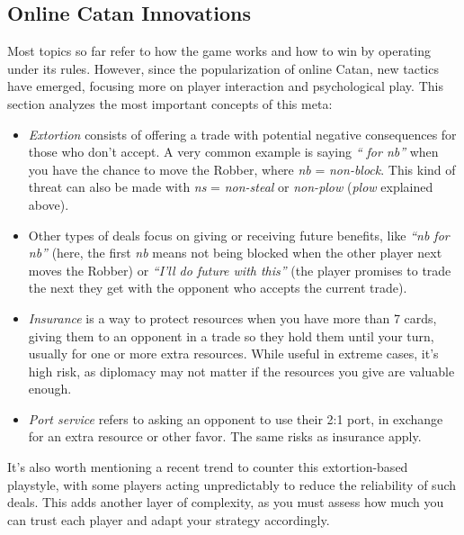 \documentclass[12pt]{article}
\begin{document}
\subsection{Online Catan Innovations}
Most topics so far refer to how the game works and how to win by operating under its rules.
However, since the popularization of online Catan, new tactics have emerged, focusing more on player interaction and psychological play.
This section analyzes the most important concepts of this meta:
\vspace{-0.2cm}
\begin{itemize}
    \item \textit{Extortion} consists of offering a trade with potential negative consequences for those who don't accept. 
    A very common example is saying \textit{`` for nb''} when you have the chance to move the Robber, where \textit{nb} = \textit{non-block}.
    This kind of threat can also be made with \textit{ns} = \textit{non-steal} or \textit{non-plow} (\textit{plow} explained above).
    \vspace{-0.2cm}
    \item Other types of deals focus on giving or receiving future benefits, like
    \textit{``nb for nb''} (here, the first \textit{nb} means not being blocked when the other player next moves the Robber) or
    \textit{``I'll do future  with this''} (the player promises to trade the next  they get with the opponent who accepts the current trade).
    \vspace{-0.2cm}
    \item \textit{Insurance} is a way to protect resources when you have more than 7 cards, giving them to an opponent in a trade so they hold them until your turn, usually for one or more extra resources.
    While useful in extreme cases, it's high risk, as diplomacy may not matter if the resources you give are valuable enough.
    \vspace{-0.2cm}
    \item \textit{Port service} refers to asking an opponent to use their 2:1 port, in exchange for an extra resource or other favor.
    The same risks as insurance apply.
\end{itemize}
\vspace{-0.2cm}
It's also worth mentioning a recent trend to counter this extortion-based playstyle, with some players acting unpredictably to reduce the reliability of such deals.
This adds another layer of complexity, as you must assess how much you can trust each player and adapt your strategy accordingly.
\end{document}
